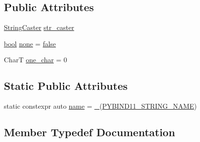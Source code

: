 \subsection*{Public Attributes}
\begin{DoxyCompactItemize}
\item 
\mbox{\hyperlink{structtype__caster_3_01_char_t_00_01enable__if__t_3_01is__std__char__type_3_01_char_t_01_4_1_1value_01_4_01_4_a10a64e7a7ab17aff6f024a8476cc22cc}{String\+Caster}} \mbox{\hyperlink{structtype__caster_3_01_char_t_00_01enable__if__t_3_01is__std__char__type_3_01_char_t_01_4_1_1value_01_4_01_4_a038aec9c5330b12a30e091c875dc9dc1}{str\+\_\+caster}}
\item 
\mbox{\hyperlink{asdl_8h_af6a258d8f3ee5206d682d799316314b1}{bool}} \mbox{\hyperlink{structtype__caster_3_01_char_t_00_01enable__if__t_3_01is__std__char__type_3_01_char_t_01_4_1_1value_01_4_01_4_aa7df1858325db89834a332136e51713d}{none}} = \mbox{\hyperlink{asdl_8h_af6a258d8f3ee5206d682d799316314b1ae9de385ef6fe9bf3360d1038396b884c}{false}}
\item 
CharT \mbox{\hyperlink{structtype__caster_3_01_char_t_00_01enable__if__t_3_01is__std__char__type_3_01_char_t_01_4_1_1value_01_4_01_4_aefebfa3ea5705ebd5d53d28a8550c639}{one\+\_\+char}} = 0
\end{DoxyCompactItemize}
\subsection*{Static Public Attributes}
\begin{DoxyCompactItemize}
\item 
static constexpr auto \mbox{\hyperlink{structtype__caster_3_01_char_t_00_01enable__if__t_3_01is__std__char__type_3_01_char_t_01_4_1_1value_01_4_01_4_ac5b1cfa08e19fa977b842cf65d4e5722}{name}} = \mbox{\hyperlink{descr_8h_af114703e20c6527e87163eb2798f74b8}{\+\_\+}}(\mbox{\hyperlink{detail_2common_8h_a4490c1733364f04fcea017da2eb38d38}{P\+Y\+B\+I\+N\+D11\+\_\+\+S\+T\+R\+I\+N\+G\+\_\+\+N\+A\+ME}})
\end{DoxyCompactItemize}


\subsection{Member Typedef Documentation}
\mbox{\label{structtype__caster_3_01_char_t_00_01enable__if__t_3_01is__std__char__type_3_01_char_t_01_4_1_1value_01_4_01_4_a319a8c4e37e2511027792bed0fc54637}} 
